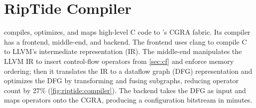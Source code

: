 \newcommand{\pes}{PEs\xspace}
\newcommand{\fend}{frontend\xspace}
\newcommand{\mend}{middle-end\xspace}
\newcommand{\bend}{backend\xspace}

\section{RipTide Compiler}
\label{sec:compiler}

\riptide compiles, optimizes, and maps high-level C code to \riptide's CGRA fabric. 
%
%
%
%
%
Its compiler has a \fend, \mend, and \bend.
%
The \fend uses clang to compile C to LLVM's intermediate representation (IR).
%
% 
The \mend manipulates the LLVM IR to insert control-flow operators from  \autoref{sec:cf} and enforce memory ordering; then it translates the IR to a dataflow graph (DFG) representation and optimizes the DFG by transforming and fusing subgraphs, reducing operator count by 27\%
(\autoref{fig:riptide:compiler}).
%
%
%
%
The \bend takes the DFG as input and maps operators onto the CGRA,
producing a configuration bitstream in minutes.
%
%

